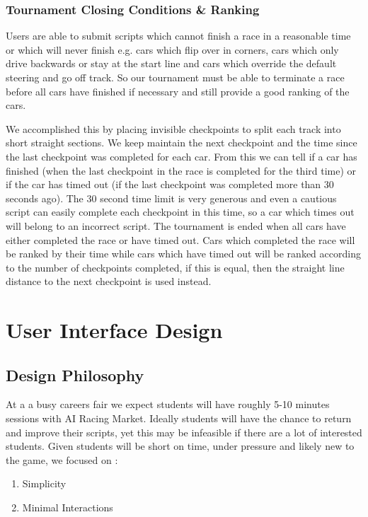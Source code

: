 \subsubsection{Tournament Closing Conditions \& Ranking}
Users are able to submit scripts which cannot finish a race in a reasonable time or which will never finish e.g. cars which flip over in corners, cars which only drive backwards or stay at the start line and cars which override the default steering and go off track. So our tournament must be able to terminate a race before all cars have finished if necessary and still provide a good ranking of the cars.

We accomplished this by placing invisible checkpoints to split each track into short straight sections. We keep maintain the next checkpoint and the time since the last checkpoint was completed for each car. From this we can tell if a car has finished (when the last checkpoint in the race is completed for the third time) or if the car has timed out (if the last checkpoint was completed more than 30 seconds ago). The 30 second time limit is very generous and even a cautious script can easily complete each checkpoint in this time, so a car which times out will belong to an incorrect script. The tournament is ended when all cars have either completed the race or have timed out. Cars which completed the race will be ranked by their time while cars which have timed out will be ranked according to the number of checkpoints completed, if this is equal, then the straight line distance to the next checkpoint is used instead.

\section{User Interface Design}

\subsection{Design Philosophy}

At a a busy careers fair we expect students will have roughly 5-10 minutes sessions with AI Racing Market. Ideally students will have the chance to return and improve their scripts, yet this may be infeasible if there are a lot of interested students. Given students will be short on time, under pressure and likely new to the game, we focused on :
\vspace{-1mm}
\begin{enumerate} \itemsep -2pt 
\item Simplicity
\item Minimal Interactions
\end{enumerate}

